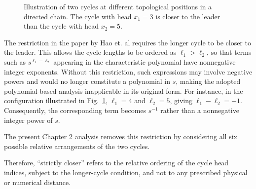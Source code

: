 \documentclass[11pt,a4paper]{article}
\begin{document}
\begin{figure}[H]
	\centering
	\caption{Illustration of two cycles at different topological
		positions in a directed chain. The cycle with head $x_1=3$
		is closer to the leader than the cycle with head $x_2=5$.}
	\label{fig:topological_cycle_position}
\end{figure}


The restriction in the paper by Hao et. al \cite{hao2019role} requires the longer cycle to be closer to the leader. This allows the cycle lengths to be ordered as $\ell_1>\ell_2$, so that terms such as $s^{\ell_1-\ell_2}$ appearing in the characteristic polynomial have nonnegative integer exponents. Without this restriction, such expressions may involve negative powers and would no longer constitute a polynomial in $s$, making the adopted polynomial-based analysis inapplicable in its original form. For instance, in the configuration illustrated in
Fig.~\ref{fig:topological_cycle_position}, $\ell_1=4$ and $\ell_2=5$, giving $\ell_1-\ell_2=-1$. Consequently, the
corresponding term becomes $s^{-1}$ rather than a nonnegative integer power of $s$. 

The present Chapter 2 analysis removes this restriction by considering all six possible relative arrangements of the two cycles.

Therefore, ``strictly closer'' refers to the relative ordering of the cycle head indices, subject to the longer-cycle condition, and not to any prescribed physical or numerical distance.
\end{document}

